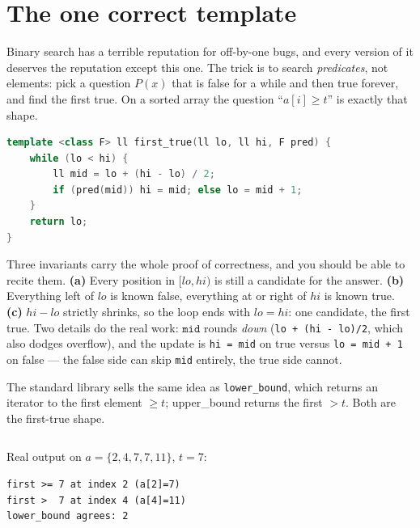 \section{The one correct template}\label{sec:bs-template}

Binary search has a terrible reputation for off-by-one bugs, and every
version of it deserves the reputation except this one. The trick is to
search \emph{predicates}, not elements: pick a question $P(x)$ that is
false for a while and then true forever, and find the first true.
On a sorted array the question ``$a[i] \ge t$'' is exactly that shape.

\begin{lstlisting}[language=C++,caption={\texttt{lib/bsearch.h}: first
true in ${[lo,hi]}$, given a predicate monotone on the whole
interval.},label={lst:bsearch}]
template <class F> ll first_true(ll lo, ll hi, F pred) {
    while (lo < hi) {
        ll mid = lo + (hi - lo) / 2;
        if (pred(mid)) hi = mid; else lo = mid + 1;
    }
    return lo;
}
\end{lstlisting}

Three invariants carry the whole proof of correctness, and you should be
able to recite them. \textbf{(a)} Every position in $[lo,hi)$ is still a
candidate for the answer. \textbf{(b)} Everything left of $lo$ is known
false, everything at or right of $hi$ is known true.
\textbf{(c)} $hi - lo$ strictly shrinks, so the loop ends with
$lo = hi$: one candidate, the first true.
Two details do the real work: $\texttt{mid}$ rounds \emph{down}
(\texttt{lo + (hi - lo)/2}, which also dodges overflow), and the update
is \texttt{hi = mid} on true versus \texttt{lo = mid + 1} on false ---
the false side can skip \texttt{mid} entirely, the true side cannot.

The standard library sells the same idea as \texttt{lower\_bound}, which
returns an iterator to the first element $\ge t$; upper\_bound returns
the first $> t$. Both are the first-true shape.

\begin{lstlisting}[language=C++,caption={\texttt{bsearch\_template.cpp}:
the template and \texttt{lower\_bound} agree.},label={lst:bstemp}]
\end{lstlisting}


Real output on $a = \{2,4,7,7,11\}$, $t = 7$:
\begin{lstlisting}[numbers=none]
first >= 7 at index 2 (a[2]=7)
first >  7 at index 4 (a[4]=11)
lower_bound agrees: 2
\end{lstlisting}

